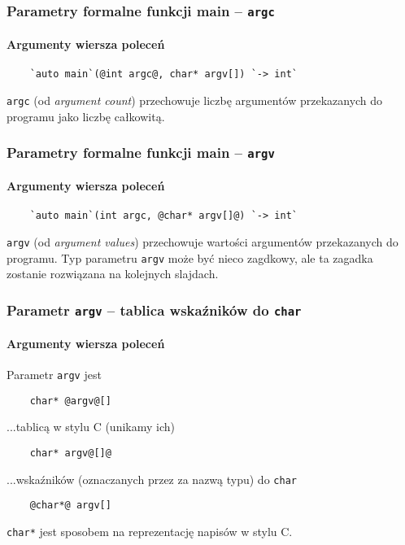 \documentclass[aspectratio=169]{beamer}
\begin{document}
\begin{frame}[fragile]
    \frametitle{Parametry formalne funkcji main -- {\tt argc}}
    \framesubtitle{Argumenty wiersza poleceń}

    \begin{lstlisting}
    `auto main`(@int argc@, char* argv[]) `-> int`
    \end{lstlisting}

    {\tt argc} (od \emph{argument count}) przechowuje liczbę argumentów
    przekazanych do programu jako liczbę całkowitą.
\end{frame}

\begin{frame}[fragile]
    \frametitle{Parametry formalne funkcji main -- {\tt argv}}
    \framesubtitle{Argumenty wiersza poleceń}

    \begin{lstlisting}
    `auto main`(int argc, @char* argv[]@) `-> int`
    \end{lstlisting}

    {\tt argv} (od \emph{argument values}) przechowuje wartości argumentów
    przekazanych do programu. Typ parametru {\tt argv} może być nieco zagdkowy,
    ale ta zagadka zostanie rozwiązana na kolejnych slajdach.
\end{frame}

\begin{frame}[fragile]
    \frametitle{Parametr {\tt argv} -- tablica wskaźników do {\tt char}}
    \framesubtitle{Argumenty wiersza poleceń}

    Parametr {\tt argv} jest
    \begin{lstlisting}
    char* @argv@[]
    \end{lstlisting}
    \vspace{1em}

    ...tablicą w stylu C (unikamy ich)
    \begin{lstlisting}
    char* argv@[]@
    \end{lstlisting}
    \vspace{1em}

    ...wskaźników (oznaczanych przez {\tt *} za nazwą typu) do {\tt char}
    \begin{lstlisting}
    @char*@ argv[]
    \end{lstlisting}
    \vspace{1em}

    {\tt char*} jest sposobem na reprezentację napisów w stylu C.
\end{frame}
\end{document}
